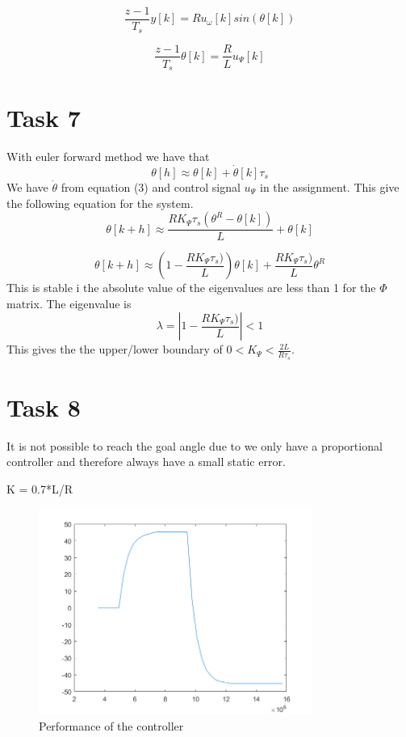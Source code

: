 \documentclass[a4paper,12pt,oneside,onecolumn]{article} %
\begin{document}
\begin{equation}
\frac{z-1}{T_s} y[k] = Ru_\omega[k] sin(\theta[k]) \label{dYdot}
\end{equation}

\begin{equation}
\frac{z-1}{T_s} \theta[k] = \frac{R}{L}u_\Psi[k]\label{dPdot}
\end{equation}


\section*{Task 7}

With euler forward method we have that
\begin{equation*}
\theta[h]\approx \theta[k]+\dot{\theta}[k]\tau_s
\end{equation*}
We have $\dot{\theta}$ from equation (3) and control signal $u_\Psi$ in the assignment. This give the following equation for the system.
\begin{equation*}
\theta[k+h]\approx  \frac{R K_\Psi \tau_s(\theta^R-\theta[k])}{L}+\theta[k]
\end{equation*}

\begin{equation*}
\theta[k+h]\approx  (1-\frac{R K_\Psi \tau_s)}{L})\theta[k]+\frac{R K_\Psi \tau_s)}{L}\theta^R
\end{equation*}
This is stable i the absolute value of the eigenvalues are less than 1 for the $\Phi$ matrix. The eigenvalue is
\begin{equation*}
\lambda = |1-\frac{R K_\Psi \tau_s)}{L}|<1
\end{equation*}
This gives the the upper/lower boundary of $0<K_\Psi<\frac{2L}{R\tau_s}$. 

\section*{Task 8}

It is not possible to reach the goal angle due to we only have a proportional controller and therefore always have a small static error.

K = 0.7*L/R
\begin{figure}[H]
\begin{center}	
  \includegraphics[width = 0.8\textwidth]{task8.png}
  \caption{Performance of the controller}
  
 \end{center}
\end{figure}
\end{document}
